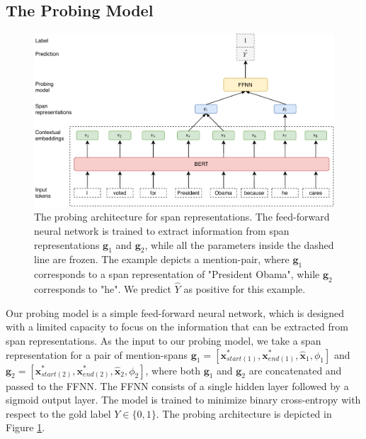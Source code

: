 \documentclass[11pt]{article}
\begin{document}
\subsection{The Probing Model}
\begin{figure}[ht]
  \includegraphics[width=\textwidth]{probing_model}
  \caption{The probing architecture for span representations. The feed-forward neural network is trained to extract information from span representations $\pmb{g}_{1}$ and $\pmb{g}_{2}$, while all the parameters inside the dashed line are frozen. The example depicts a mention-pair, where $\pmb{g}_{1}$ corresponds to a span representation of "President Obama", while $\pmb{g}_{2}$ corresponds to "he". We predict $\hat{Y}$ as positive for this example.}
  \label{fig:probing_model}
\end{figure}

Our probing model is a simple feed-forward neural network, which is designed with a limited capacity to focus on the information that can be extracted from span representations.
As the input to our probing model, we take a span representation for a pair of mention-spans $\pmb{g}_{1} = [\pmb{x}_{start(1)}^{*}, \pmb{x}_{end(1)}^{*}, \hat{\pmb{x}}_{1}, \phi_{1}]$ and $\pmb{g}_{2} = [\pmb{x}_{start(2)}^{*}, \pmb{x}_{end(2)}^{*}, \hat{\pmb{x}}_{2}, \phi_{2}]$, where both $\pmb{g}_{1}$ and $\pmb{g}_{2}$ are concatenated and passed to the FFNN. The FFNN consists of a single hidden layer followed by a sigmoid output layer. The model is trained to minimize binary cross-entropy with respect to the gold label $Y \in \{0,1\}$. The probing architecture is depicted in Figure \ref{fig:probing_model}.
\end{document}
